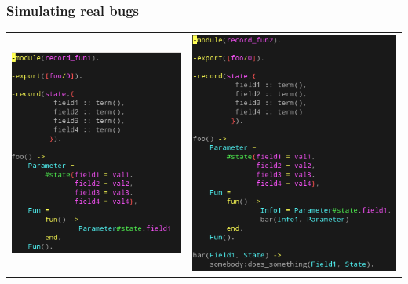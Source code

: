 \begin{frame}
\frametitle{Simulating real bugs}

\begin{center}
\begin{tabular}{ c c }
  	\includegraphics[scale=0.4]{../figures/rec_fun1}
&
	\includegraphics[scale=0.4]{../figures/rec_fun2}
\end{tabular}
\end{center}
\end{frame}